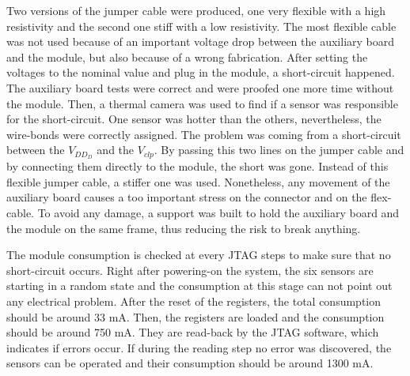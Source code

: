   Two versions of the jumper cable were produced, one very flexible with a high resistivity and the second one stiff with a low resistivity.
  The most flexible cable was not used because of an important voltage drop between the auxiliary board and the module, but also because of a wrong fabrication.
  After setting the voltages to the nominal value and plug in the module, a short-circuit happened.
  The auxiliary board tests were correct and were proofed one more time without the module.
  Then, a thermal camera was used to find if a sensor was responsible for the short-circuit.
  One sensor was hotter than the others, nevertheless, the wire-bonds were correctly assigned.
  The problem was coming from a short-circuit between the $V_{DD_D}$ and the $V_{clp}$.
  By passing this two lines on the jumper cable and by connecting them directly to the module, the short was gone.
  Instead of this flexible jumper cable, a stiffer one was used.
  Nonetheless, any movement of the auxiliary board causes a too important stress on the connector and on the flex-cable.
  To avoid any damage, a support was built to hold the auxiliary board and the module on the same frame, thus reducing the risk to break anything.

  The module consumption is checked at every JTAG steps to make sure that no short-circuit occurs.
  Right after powering-on the system, the six sensors are starting in a random state and the consumption at this stage can not point out any electrical problem.
  After the reset of the registers, the total consumption should be around 33 mA.
  Then, the registers are loaded and the consumption should be around 750 mA.
  They are read-back by the JTAG software, which indicates if errors occur.
  If during the reading step no error was discovered, the sensors can be operated and their consumption should be around 1300 mA.



